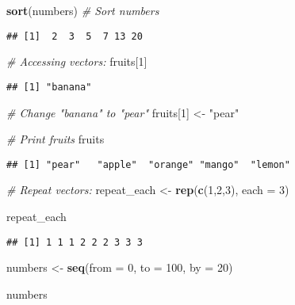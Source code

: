 \documentclass[
]{article}
\newenvironment{Shaded}{\begin{snugshade}}{\end{snugshade}}
\newcommand{\AttributeTok}[1]{\textcolor[rgb]{0.13,0.29,0.53}{#1}}
\newcommand{\CommentTok}[1]{\textcolor[rgb]{0.56,0.35,0.01}{\textit{#1}}}
\newcommand{\DecValTok}[1]{\textcolor[rgb]{0.00,0.00,0.81}{#1}}
\newcommand{\FunctionTok}[1]{\textcolor[rgb]{0.13,0.29,0.53}{\textbf{#1}}}
\newcommand{\NormalTok}[1]{#1}
\newcommand{\OtherTok}[1]{\textcolor[rgb]{0.56,0.35,0.01}{#1}}
\newcommand{\StringTok}[1]{\textcolor[rgb]{0.31,0.60,0.02}{#1}}
\begin{document}
\begin{Shaded}
\begin{Highlighting}[]
\FunctionTok{sort}\NormalTok{(numbers) }\CommentTok{\# Sort numbers}
\end{Highlighting}
\end{Shaded}

\begin{verbatim}
## [1]  2  3  5  7 13 20
\end{verbatim}

\begin{Shaded}
\begin{Highlighting}[]
\CommentTok{\# Accessing vectors:}
\NormalTok{fruits[}\DecValTok{1}\NormalTok{]}
\end{Highlighting}
\end{Shaded}

\begin{verbatim}
## [1] "banana"
\end{verbatim}

\begin{Shaded}
\begin{Highlighting}[]
\CommentTok{\# Change "banana" to "pear"}
\NormalTok{fruits[}\DecValTok{1}\NormalTok{] }\OtherTok{\textless{}{-}} \StringTok{"pear"}

\CommentTok{\# Print fruits}
\NormalTok{fruits}
\end{Highlighting}
\end{Shaded}

\begin{verbatim}
## [1] "pear"   "apple"  "orange" "mango"  "lemon"
\end{verbatim}

\begin{Shaded}
\begin{Highlighting}[]
\CommentTok{\# Repeat vectors:}
\NormalTok{repeat\_each }\OtherTok{\textless{}{-}} \FunctionTok{rep}\NormalTok{(}\FunctionTok{c}\NormalTok{(}\DecValTok{1}\NormalTok{,}\DecValTok{2}\NormalTok{,}\DecValTok{3}\NormalTok{), }\AttributeTok{each =} \DecValTok{3}\NormalTok{)}

\NormalTok{repeat\_each}
\end{Highlighting}
\end{Shaded}

\begin{verbatim}
## [1] 1 1 1 2 2 2 3 3 3
\end{verbatim}

\begin{Shaded}
\begin{Highlighting}[]
\NormalTok{numbers }\OtherTok{\textless{}{-}} \FunctionTok{seq}\NormalTok{(}\AttributeTok{from =} \DecValTok{0}\NormalTok{, }\AttributeTok{to =} \DecValTok{100}\NormalTok{, }\AttributeTok{by =} \DecValTok{20}\NormalTok{)}

\NormalTok{numbers}
\end{Highlighting}
\end{Shaded}
\end{document}
